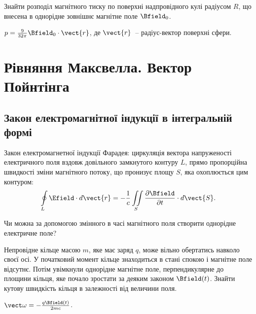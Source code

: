 \begin{problem}
Знайти розподіл магнітного тиску по поверхні надпровідного кулі радіусом $R$, що внесена в однорідне зовнішнє магнітне поле $\Bfield_0$.
\begin{solution}
	$ p = \frac{9}{32\pi} \Bfield_0\cdot\vect{r}$, де $\vect{r}$~-- радіус-вектор поверхні сфери.
\end{solution}
\end{problem}


\section{Рівняння Максвелла. Вектор Пойнтінга}

\subsection*{Закон електромагнітної індукції в інтегральній формі}
\begin{Theory}
	Закон електромагнетної індукції Фарадея: циркуляція вектора напруженості електричного поля вздовж довільного замкнутого контуру $L$, прямо пропорційна швидкості зміни магнітного потоку, що пронизує площу $S$, яка охоплюється цим контуром:
	\begin{equation}
		\oint\limits_L \Efield \cdot d\vect{r} = - \frac1c\iint\limits_S \frac{\partial \Bfield}{\partial t}\cdot d\vect{S}.
	\end{equation}
\end{Theory}

\begin{problem}
    Чи можна за допомогою змінного в часі магнітного поля створити однорідне електричне поле?
\end{problem}

\begin{problem}\label{prb:aka_Faynmann_disk_paradox}
Непровідне кільце масою $m$, яке має заряд $q$, може вільно обертатись навколо своєї осі. У початковий момент кільце знаходиться в стані спокою і магнітне поле відсутнє. Потім увімкнули однорідне магнітне поле, перпендикулярне до площини кільця, яке почало зростати за деяким законом $\Bfield(t)$. Знайти кутову швидкість кільця в залежності від величини поля.
\begin{solution}
	$\vect\omega = -\frac{q\Bfield(t)}{2mc}$.
\end{solution}
\end{problem}


